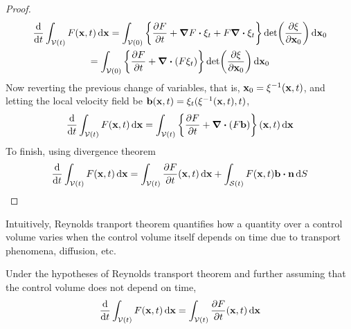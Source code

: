\begin{proof}
	\begin{multline*}
		\frac{\dd}{\dd{t}} \int_{\cv{}(t)} F(\vb{x}, t) \dd{\vb{x}} = 
		\int_{\cv{}(0)} 
		\left\{
		\frac{\partial F}{\partial t} + \grad{F} \vdot \xi_t + F \div{\xi_t}
		\right\} \det(\frac{\partial \xi}{\partial \vb{x}_0}) \dd{\vb{x}_0} 
		\\ = 
		\int_{\cv{}(0)} 
		\left\{	\frac{\partial F}{\partial t} + \div(F \xi_t) \right\} \det(\frac{\partial \xi}{\partial \vb{x}_0}) \dd{\vb{x}_0}
	\end{multline*}
	Now reverting the previous change of variables, that is, $\vb{x}_0 = \xi^{-1}(\vb{x}, t)$, and letting the local velocity field be $\vb{b}(\vb{x},t) = \xi_t(\xi^{-1}(\vb{x},t),t)$,
	\begin{equation*}
		\frac{\dd}{\dd{t}} \int_{\mathcal{V}_{}(t)} F(\vb{x}, t) \dd{\vb{x}} = 
		\int_{\mathcal{V}_{}(t)} 
		\left\{ \frac{\partial F}{\partial t}  + \div(F \vb{b}) \right\} (\vb{x}, t) \dd{\vb{x}}
	\end{equation*}
	To finish, using divergence theorem
	\begin{equation*}
		\frac{\dd}{\dd{t}} \int_{\cv{}(t)} F(\vb{x}, t) \dd{\vb{x}} = 
		\int_{\cv{}(t)} \frac{\partial F}{\partial t} (\vb{x}, t) \dd{\vb{x}} +
		\int_{\cs{}(t)} F(\vb{x}, t) \vb{b} \vdot \vb{n} \dd{S}
	\end{equation*}
\end{proof}

Intuitively, Reynolds tranport theorem quantifies how a quantity over a control volume varies when the control volume itself depends on time due to transport phenomena, diffusion, etc. 

\begin{col}
	Under the hypotheses of Reynolds transport theorem and further assuming that the control volume does not depend on time,
	\begin{equation}
		\frac{\dd}{\dd{t}} \int_{\mathcal{V}_{}(t)} F(\vb{x}, t) \dd{\vb{x}} = 
		\int_{\mathcal{V}_{}(t)} \frac{\partial F}{\partial t} (\vb{x}, t) \dd{\vb{x}}
	\end{equation}	
\end{col}





